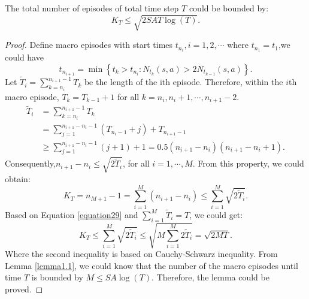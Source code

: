 \begin{lemma}
\label{lemma1.2}
The total number of episodes of total time step $T$ could be bounded by:
$$
K_{T} \leq \sqrt{2 S A T \log (T)}.
$$\cite{NIPS2017_36e729ec}
\begin{proof}
Define macro episodes with start times $t_{n_{i}},i=1,2,\cdots$ where $t_{n_{1}}=t_{1}$,we could have
$$
t_{n_{i+1}}=\min \left\{t_{k}>t_{n_{i}}: N_{t_{k}}(s, a)>2 N_{t_{k-1}}(s, a) \right\}.
$$
Let $\tilde{T}_{i}=\sum_{k=n_{i}}^{n_{i+1}-1} T_{k}$ be the length of the ith episode. Therefore, within the $i$th macro episode, $T_{k} = T_{k-1}+1$ for all $k = n_{i},n_{i}+1,\cdots,n_{i+1}-2$.
\begin{equation}
\begin{aligned}
\tilde{T}_{i}&=\sum_{k=n_{i}}^{n_{i+1}-1} T_{k} \\ &=\sum_{j=1}^{n_{i+1}-n_{i}-1}\left(T_{n_{i}-1}+j\right)+T_{n_{i+1}-1} \\
& \geq \sum_{j=1}^{n_{i+1}-n_{i}-1}(j+1)+1=0.5\left(n_{i+1}-n_{i}\right)\left(n_{i+1}-n_{i}+1\right) .
\end{aligned}
\end{equation}
Consequently,$n_{i+1}-n_{i} \leq \sqrt{2 \tilde{T}_{i}}$, for all $i = 1,\cdots,M$. From this property, we could obtain:
\begin{equation}
\label{equation29}
K_{T}=n_{M+1}-1=\sum_{i=1}^{M}\left(n_{i+1}-n_{i}\right) \leq \sum_{i=1}^{M} \sqrt{2 \tilde{T}_{i}}.
\end{equation}
Based on Equation \ref{equation29} and $\sum_{i=1}^{M} \tilde{T}_{i}=T$, we could get:
\begin{equation}
K_{T} \leq \sum_{i=1}^{M} \sqrt{2 \tilde{T}_{i}} \leq \sqrt{M \sum_{i=1}^{M} 2 \tilde{T}_{i}}=\sqrt{2 M T}.
\end{equation}
Where the second inequality is based on Cauchy-Schwarz inequality. From Lemma \ref{lemma1.1}, we could know that the number of the macro episodes until time $T$ is bounded by $M \leq SA\log(T)$. Therefore, the lemma could be proved.
\end{proof}
\end{lemma}


